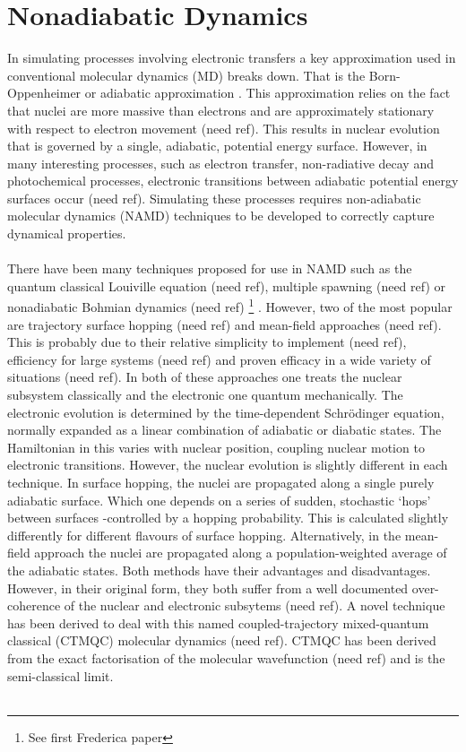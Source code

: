 \section{Nonadiabatic Dynamics}
In simulating processes involving electronic transfers a key approximation used in conventional molecular dynamics (MD) breaks down. That is the Born-Oppenheimer or adiabatic approximation \cite{john_c._tully_nonadiabatic_nodate}. This approximation relies on the fact that nuclei are more massive than electrons and are approximately stationary with respect to electron movement (need ref). This results in nuclear evolution that is governed by a single, adiabatic, potential energy surface. However, in many interesting processes, such as electron transfer, non-radiative decay and photochemical processes, electronic transitions between adiabatic potential energy surfaces occur (need ref). Simulating these processes requires non-adiabatic molecular dynamics (NAMD) techniques to be developed to correctly capture dynamical properties.
\\\\
There have been many techniques proposed for use in NAMD such as the quantum classical Louiville equation (need ref), multiple spawning (need ref) or nonadiabatic Bohmian dynamics (need ref) \footnote{See first Frederica paper} . However, two of the most popular are trajectory surface hopping (need ref) and mean-field approaches (need ref). This is probably due to their relative simplicity to implement (need ref), efficiency for large systems (need ref) and proven efficacy in a wide variety of situations (need ref). In both of these approaches one treats the nuclear subsystem classically and the electronic one quantum mechanically. The electronic evolution is determined by the time-dependent Schr\"odinger equation, normally expanded as a linear combination of adiabatic or diabatic states. The Hamiltonian in this varies with nuclear position, coupling nuclear motion to electronic transitions. However, the nuclear evolution is slightly different in each technique. In surface hopping, the nuclei are propagated along a single purely adiabatic surface. Which one depends on a series of sudden, stochastic `hops' between surfaces -controlled by a hopping probability. This is calculated slightly differently for different flavours of surface hopping. Alternatively, in the mean-field approach the nuclei are propagated along a population-weighted average of the adiabatic states. Both methods have their advantages and disadvantages. However, in their original form, they both suffer from a well documented over-coherence of the nuclear and electronic subsytems (need ref). A novel technique has been derived to deal with this named coupled-trajectory mixed-quantum classical (CTMQC) molecular dynamics (need ref). CTMQC has been derived from the exact factorisation of the molecular wavefunction (need ref) and is the semi-classical limit.
\\
\\
